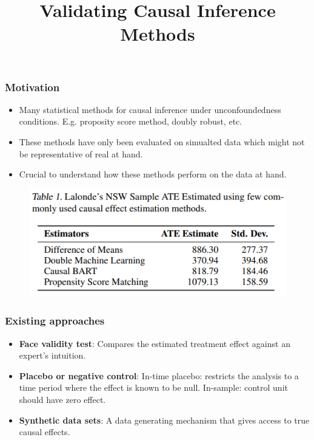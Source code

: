 \documentclass{beamer}
\begin{document}
\title[]{Validating Causal Inference Methods}
\author [] {}
\date{}

\begin{frame}
	\frametitle{Motivation}
	\begin{itemize}
		\item Many statistical methods for causal inference under unconfoundedness conditions. E.g. proposity score method, doubly robust, etc.
		\item These methods have only been evaluated on simualted data which might not be representative of real at hand.
		\item Crucial to understand how these methods perform on the data at hand.
	\end{itemize}
	\begin{figure}
		\includegraphics[scale=0.6]{imgs/comparison.png}
	\end{figure}
\end{frame}
\begin{frame}
	\frametitle{Existing approaches}
	\begin{itemize}
		\item \textbf{Face validity test}: Compares the estimated treatment effect against an expert's intuition.
		\item \textbf{Placebo or negative control}: In-time placebo: restricts the analysis to a time period where the effect is known to be null. In-sample: control unit should have zero effect.
		\item \textbf{Synthetic data sets}: A data generating mechanism that gives access to true causal effects.
	\end{itemize}
\end{frame}
\end{document}
